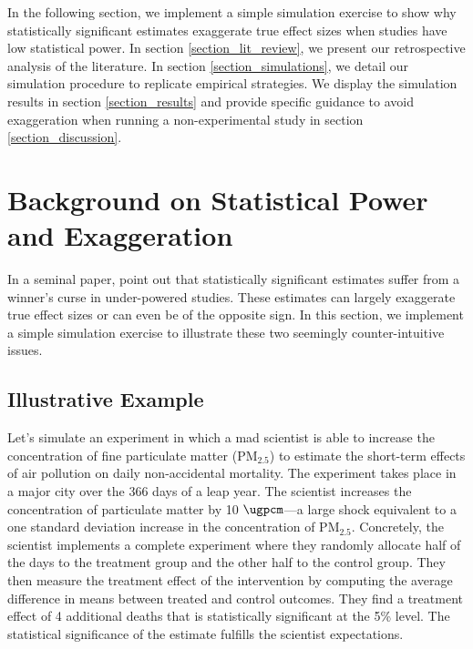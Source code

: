 \documentclass[12pt]{article}
\begin{document}
    In the following section, we implement a simple simulation exercise to show why statistically significant estimates exaggerate true effect sizes when studies have low statistical power. In section \ref{section_lit_review}, we present our retrospective analysis of the literature. In section \ref{section_simulations}, we detail our simulation procedure to replicate empirical strategies. We display the simulation results in section \ref{section_results} and provide specific guidance to avoid exaggeration when running a non-experimental study in section \ref{section_discussion}.
    




\section{Background on Statistical Power and Exaggeration}\label{section_mad_scientist}

    In a seminal paper, \cite{gelman_beyond_2014} point out that statistically significant estimates suffer from a winner's curse in under-powered studies. These estimates can largely exaggerate true effect sizes or can even be of the opposite sign. In this section, we implement a simple simulation exercise to illustrate these two seemingly counter-intuitive issues. 

    \subsection{Illustrative Example}

    Let's simulate an experiment in which a mad scientist is able to increase the concentration of fine particulate matter (PM$_{2.5}$) to estimate the short-term effects of air pollution on daily non-accidental mortality. The experiment takes place in a major city over the 366 days of a leap year. The scientist increases the concentration of particulate matter by 10 $\si{\ugpcm}$---a large shock equivalent to a one standard deviation increase in the concentration of PM$_{2.5}$. Concretely, the scientist implements a complete experiment where they randomly allocate half of the days to the treatment group and the other half to the control group. They then measure the treatment effect of the intervention by computing the average difference in means between treated and control outcomes. They find a treatment effect of 4 additional deaths that is statistically significant at the 5\% level. The statistical significance of the estimate fulfills the scientist expectations.
\end{document}
